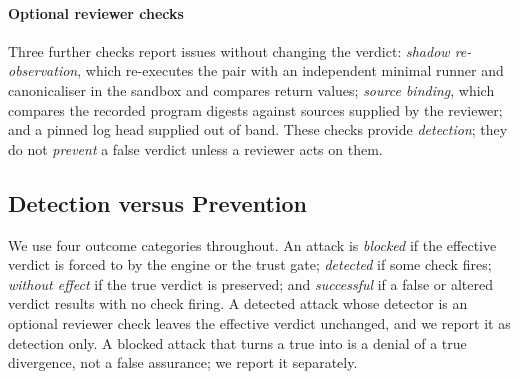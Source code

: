 \paragraph*{Optional reviewer checks} Three further checks report issues without changing the verdict: \emph{shadow re-observation}, which re-executes the pair with an independent minimal runner and canonicaliser in the sandbox and compares return values; \emph{source binding}, which compares the recorded program digests against sources supplied by the reviewer; and a pinned log head supplied out of band. These checks provide \emph{detection}; they do not \emph{prevent} a false verdict unless a reviewer acts on them.

\subsection{Detection versus Prevention}
We use four outcome categories throughout. An attack is \emph{blocked} if the effective verdict is forced to \INS{} by the engine or the trust gate; \emph{detected} if some check fires; \emph{without effect} if the true verdict is preserved; and \emph{successful} if a false or altered verdict results with no check firing. A detected attack whose detector is an optional reviewer check leaves the effective verdict unchanged, and we report it as detection only. A blocked attack that turns a true \DIV{} into \INS{} is a denial of a true divergence, not a false assurance; we report it separately.
